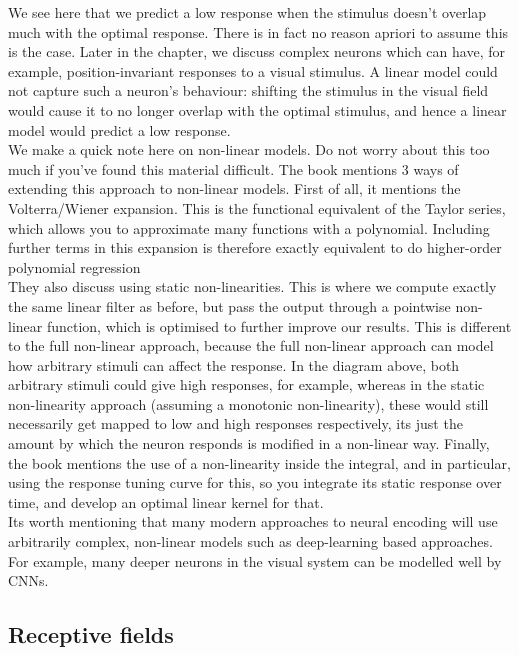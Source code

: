 \documentclass{article}
\begin{document}
We see here that we predict a low response when the stimulus doesn't overlap much with the optimal response. There is in fact no reason apriori to assume this is the case. Later in the chapter, we discuss complex neurons which can have, for example, position-invariant responses to a visual stimulus. A linear model could not capture such a neuron's behaviour: shifting the stimulus in the visual field would cause it to no longer overlap with the optimal stimulus, and hence a linear model would predict a low response.\\

We make a quick note here on non-linear models. Do not worry about this too much if you've found this material difficult. The book mentions 3 ways of extending this approach to non-linear models. First of all, it mentions the Volterra/Wiener expansion. This is the functional equivalent of the Taylor series, which allows you to approximate many functions with a polynomial. Including further terms in this expansion is therefore exactly equivalent to do higher-order polynomial regression\\

They also discuss using static non-linearities. This is where we compute exactly the same linear filter as before, but pass the output through a pointwise non-linear function, which is optimised to further improve our results. This is different to the full non-linear approach, because the full non-linear approach can model how arbitrary stimuli can affect the response. In the diagram above, both arbitrary stimuli could give high responses, for example, whereas in the static non-linearity approach (assuming a monotonic non-linearity), these would still necessarily get mapped to low and high responses respectively, its just the amount by which the neuron responds is modified in a non-linear way. Finally, the book mentions the use of a non-linearity inside the integral, and in particular, using the response tuning curve for this, so you integrate its static response over time, and develop an optimal linear kernel for that.\\

Its worth mentioning that many modern approaches to neural encoding will use arbitrarily complex, non-linear models such as deep-learning based approaches. For example, many deeper neurons in the visual system can be modelled well by CNNs.

\subsection{Receptive fields}
\end{document}
